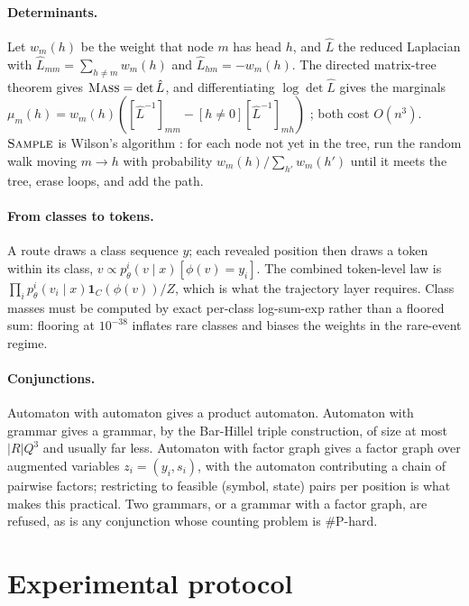 \documentclass[11pt]{article}
\theoremstyle{definition}
\newcommand{\one}{\mathbf{1}}
\newcommand{\op}[1]{\textup{\textsc{#1}}}
\begin{document}
\paragraph{Determinants.}
Let $w_m(h)$ be the weight that node $m$ has head $h$, and $\hat L$ the reduced Laplacian with
$\hat L_{mm}=\sum_{h\ne m}w_m(h)$ and $\hat L_{hm}=-w_m(h)$. The directed matrix-tree theorem gives
$\op{Mass}=\det\hat L$, and differentiating $\log\det\hat L$ gives the marginals
$\mu_m(h)=w_m(h)([\hat L^{-1}]_{mm}-[h\ne0][\hat L^{-1}]_{mh})$ \cite{koo2007}; both cost $O(n^3)$. $\op{Sample}$
is Wilson's algorithm \cite{wilson1996}: for each node not yet in the tree, run the random walk moving $m\to h$
with probability $w_m(h)/\sum_{h'}w_m(h')$ until it meets the tree, erase loops, and add the path.

\paragraph{From classes to tokens.}
A route draws a class sequence $y$; each revealed position then draws a token within its class,
$v\propto p^i_\theta(v\mid x)[\phi(v)=y_i]$. The combined token-level law is
$\prod_ip^i_\theta(v_i\mid x)\one_C(\phi(v))/Z$, which is what the trajectory layer requires. Class masses must be
computed by exact per-class log-sum-exp rather than a floored sum: flooring at $10^{-38}$ inflates rare classes
and biases the weights in the rare-event regime.

\paragraph{Conjunctions.}
Automaton with automaton gives a product automaton. Automaton with grammar gives a grammar, by the Bar-Hillel
triple construction, of size at most $|R|Q^3$ and usually far less. Automaton with factor graph gives a factor
graph over augmented variables $z_i=(y_i,s_i)$, with the automaton contributing a chain of pairwise factors;
restricting to feasible (symbol, state) pairs per position is what makes this practical. Two grammars, or a
grammar with a factor graph, are refused, as is any conjunction whose counting problem is \#P-hard.

\section{Experimental protocol}\label{app:protocol}
\end{document}
